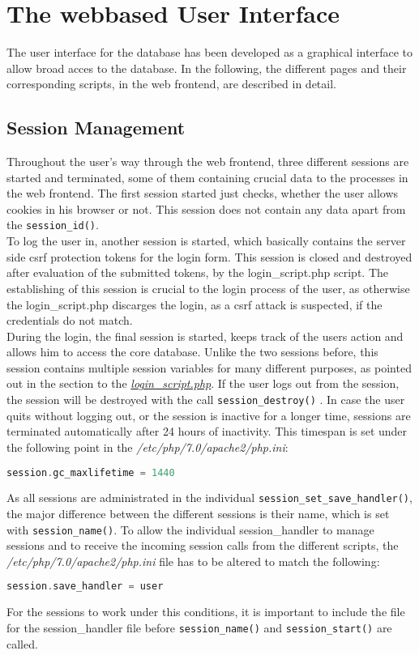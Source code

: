 
\chapter{The webbased User Interface}
The user interface for the database has been developed as a graphical interface to allow broad acces to the database. In the following, the different pages and their corresponding 
scripts, in the web frontend, are described in detail.

\section{Session Management}
Throughout the user's way through the web frontend, three different sessions are started and terminated, some of them containing crucial data to the processes in the web frontend. 
The first session started just checks, whether the user allows cookies in his browser or not. This session does not contain any data apart from the \texttt{session\_id()}.\\
To log the user in, another session is started, which basically contains the server side csrf protection tokens for the login form. This session is closed and destroyed after 
evaluation of the submitted tokens, by the login\_script.php script. The establishing of this session is crucial to the login process of the user, as otherwise the login\_script.php 
discarges the login, as a csrf attack is suspected, if the credentials do not match.\\
During the login, the final session is started, keeps track of the users action and allows him to access the core database. Unlike the two sessions before, this session contains 
multiple session variables for many different purposes, as pointed out in the section to the \hyperref[login_script]{\textit{login\_script.php}}. If the user logs out from the 
session, the session will be destroyed with the call \texttt{session\_destroy()} . In case the user quits without logging out, or the session is inactive for a longer time, sessions are 
terminated automatically after 24 hours of inactivity. This timespan is set under the following point in the \emph{/etc/php/7.0/apache2/php.ini}:
\begin{lstlisting}[language=php]
 session.gc_maxlifetime = 1440
\end{lstlisting}
As all sessions are administrated in the individual \texttt{session\_set\_save\_handler()}, the major difference between the different sessions is their name, which is set with 
\texttt{session\_name()}. To allow the individual session\_handler to manage sessions and to receive the incoming session calls from the different scripts, the 
\emph{/etc/php/7.0/apache2/php.ini} file has to be altered to match the following:
\begin{lstlisting}[language=php]
session.save_handler = user
\end{lstlisting}
For the sessions to work under this conditions, it is important to include the file for the session\_handler file before \texttt{session\_name()} and \texttt{session\_start()} 
are called.

